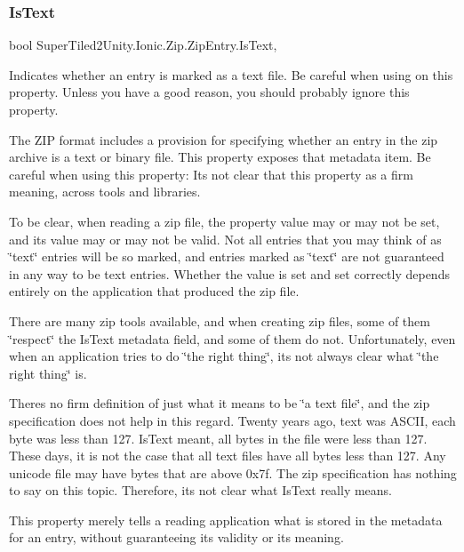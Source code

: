 \subsubsection{\texorpdfstring{Is\+Text}{IsText}}
{\footnotesize\ttfamily bool Super\+Tiled2\+Unity.\+Ionic.\+Zip.\+Zip\+Entry.\+Is\+Text\hspace{0.3cm}{\ttfamily [get]}, {\ttfamily [set]}}



Indicates whether an entry is marked as a text file. Be careful when using on this property. Unless you have a good reason, you should probably ignore this property. 

The Z\+IP format includes a provision for specifying whether an entry in the zip archive is a text or binary file. This property exposes that metadata item. Be careful when using this property\+: It\textquotesingle{}s not clear that this property as a firm meaning, across tools and libraries. 

To be clear, when reading a zip file, the property value may or may not be set, and its value may or may not be valid. Not all entries that you may think of as \char`\"{}text\char`\"{} entries will be so marked, and entries marked as \char`\"{}text\char`\"{} are not guaranteed in any way to be text entries. Whether the value is set and set correctly depends entirely on the application that produced the zip file. 

There are many zip tools available, and when creating zip files, some of them \char`\"{}respect\char`\"{} the Is\+Text metadata field, and some of them do not. Unfortunately, even when an application tries to do \char`\"{}the right thing\char`\"{}, it\textquotesingle{}s not always clear what \char`\"{}the right thing\char`\"{} is. 

There\textquotesingle{}s no firm definition of just what it means to be \char`\"{}a text file\char`\"{}, and the zip specification does not help in this regard. Twenty years ago, text was A\+S\+C\+II, each byte was less than 127. Is\+Text meant, all bytes in the file were less than 127. These days, it is not the case that all text files have all bytes less than 127. Any unicode file may have bytes that are above 0x7f. The zip specification has nothing to say on this topic. Therefore, it\textquotesingle{}s not clear what Is\+Text really means. 

This property merely tells a reading application what is stored in the metadata for an entry, without guaranteeing its validity or its meaning. 

